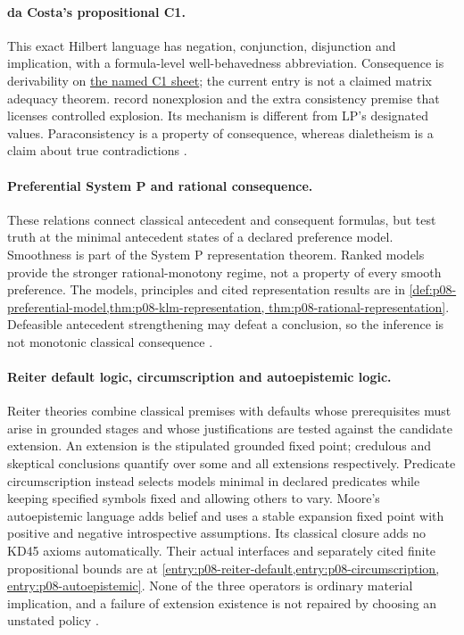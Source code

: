 \paragraph{da Costa's propositional C1.}
\label{entry:p14-directory-da-costa}
This exact Hilbert language has negation, conjunction, disjunction and
implication, with a formula-level well-behavedness abbreviation.
Consequence is derivability on
\hyperref[sheet:hilbert-da-costa-c1]{the named C1 sheet}; the current
entry is not a claimed matrix adequacy theorem.
record nonexplosion and the extra consistency premise that licenses
controlled explosion. Its mechanism is different from LP's designated
values. Paraconsistency is a property of consequence, whereas
dialetheism is a claim about true contradictions \cite{daCosta1974,Priest2006}.

\paragraph{Preferential System P and rational consequence.}
\label{entry:p14-directory-preferential}
These relations connect classical antecedent and consequent formulas,
but test truth at the minimal antecedent states of a declared preference
model. Smoothness is part of the System P representation theorem.
Ranked models provide the stronger rational-monotony regime, not a
property of every smooth preference. The models, principles and cited
representation results are in
\cref{def:p08-preferential-model,thm:p08-klm-representation,
thm:p08-rational-representation}. Defeasible antecedent strengthening
may defeat a conclusion, so the inference is not monotonic classical
consequence \cite{KrausLehmannMagidor1990,LehmannMagidor1992}.

\paragraph{Reiter default logic, circumscription and autoepistemic logic.}
\label{entry:p14-directory-defaults}
Reiter theories combine classical premises with defaults whose prerequisites
must arise in grounded stages and whose justifications are tested against
the candidate extension. An extension is the stipulated grounded fixed
point; credulous and skeptical conclusions quantify over some and all
extensions respectively. Predicate circumscription instead selects models
minimal in declared predicates while keeping specified symbols fixed and
allowing others to vary. Moore's autoepistemic language adds belief and
uses a stable expansion fixed point with positive and negative introspective
assumptions. Its classical closure adds no KD45 axioms automatically.
Their actual interfaces and separately cited finite propositional bounds
are at \cref{entry:p08-reiter-default,entry:p08-circumscription,
entry:p08-autoepistemic}. None of the three operators is ordinary material
implication, and a failure of extension existence is not repaired by choosing
an unstated policy \cite{Reiter1980,McCarthy1980,Moore1985,Gottlob1992}.

